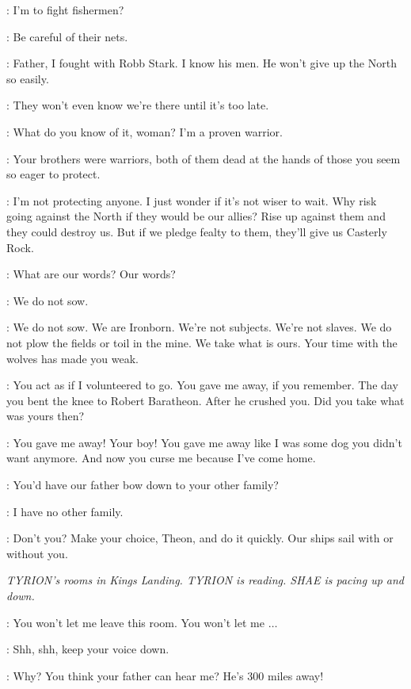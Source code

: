 \THEON: I'm to fight fishermen? 

\YARA: Be careful of their nets. 

\THEON: Father, I fought with Robb Stark. I know his men. He won't give up the North so easily. 

\YARA: They won't even know we're there until it's too late. 

\THEON: What do you know of it, woman? I'm a proven warrior. 

\BALON: Your brothers were warriors, both of them dead at the hands of those you seem so eager to protect. 

\THEON: I'm not protecting anyone. I just wonder if it's not wiser to wait. Why risk going against the North if they would be our allies? Rise up against them and they could destroy us. But if we pledge fealty to them, they'll give us Casterly Rock. 

\BALON: What are our words? Our words? 

\THEON: We do not sow. 

\BALON: We do not sow. We are Ironborn. We're not subjects. We're not slaves. We do not plow the fields or toil in the mine. We take what is ours. Your time with the wolves has made you weak. 

\THEON: You act as if I volunteered to go. You gave me away, if you remember. The day you bent the knee to Robert Baratheon. After he crushed you. Did you take what was yours then? 


\THEON: You gave me away! Your boy! You gave me away like I was some dog you didn't want anymore. And now you curse me because I've come home. 

\YARA: You'd have our father bow down to your other family? 

\THEON: I have no other family. 

\BALON: Don't you? Make your choice, Theon, and do it quickly. Our ships sail with or without you. 


\scene

\textit{TYRION's rooms in Kings Landing. TYRION is reading. SHAE is pacing up and down.} 

\SHAE: You won't let me leave this room. You won't let me $\ldots$  

\TYRION: Shh, shh, keep your voice down. 

\SHAE: Why? You think your father can hear me? He's 300 miles away! 


